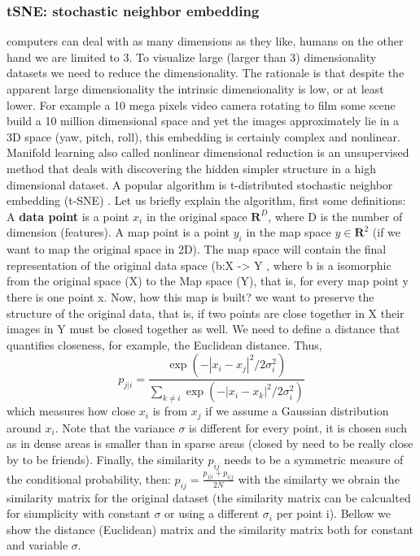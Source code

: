 \documentclass[11pt]{article}
\begin{document}
\subsubsection{tSNE: stochastic neighbor embedding}
computers can deal with as many dimensions as they like, humans on the other hand we are limited to 3. To visualize large (larger than 3) dimensionality datasets we need to reduce the dimensionality. The rationale is that despite the apparent large dimensionality the intrinsic dimensionality is low, or at least lower. For example a 10 mega pixels video camera rotating to film some scene build a 10 million dimensional space and yet the images approximately lie in a 3D space (yaw, pitch, roll), this embedding is certainly complex and nonlinear.
Manifold learning also called nonlinear dimensional reduction is an unsupervised method that deals with discovering the hidden simpler structure in a high dimensional dataset.
A popular algorithm is t-distributed stochastic neighbor embedding (t-SNE) \cite{maaten2008visualizing}.
Let us briefly explain the algorithm, first some definitions:
A \textbf{data point} is a point $x_i$ in the original space $\mathbf{R}^D$, where D is the number of dimension (features). A map point is a point $y_i$ in the map space $y \in \mathbf{R}^2$ (if we want to map the original space in 2D). The map space will contain the final representation of the original data space (b:X -> Y , where b is a isomorphic from the original space (X) to the Map space (Y), that is, for every map point y there is one point x. 
Now, how this map is built? we want to preserve the structure of the original data, that is, if two points are close together in X their images in Y must be closed together as well. We need to define a distance that quantifies closeness, for example, the Euclidean distance. Thus, 
\begin{equation}
p_{j|i} = \frac{\exp\left(-\left| x_i - x_j\right|^2 \big/ 2\sigma_i^2\right)}{\displaystyle\sum_{k \neq i} \exp\left(-\left| x_i - x_k\right|^2 \big/ 2\sigma_i^2\right)}
\end{equation}
which measures how close $x_i$ is from $x_j$ if we assume a Gaussian distribution around $x_i$. Note that the variance $\sigma$ is different for every point, it is chosen such as in dense areas is smaller than in sparse areas (closed by need to be really close by to be friends). 
Finally, the similarity $p_{ij}$ needs to be a symmetric measure of the conditional probability, then:
\(p_{ij} = \frac{p_{j|i} + p_{i|j}}{2N}\)
with the similarty we obrain the similarity matrix for the original dataset (the similarity matrix can be calcualted for siumplicity with constant $\sigma$ or using a different $\sigma_i$ per point i).
Bellow we show the distance (Euclidean) matrix and the similarity matrix both for constant and variable $\sigma$.
\end{document}
